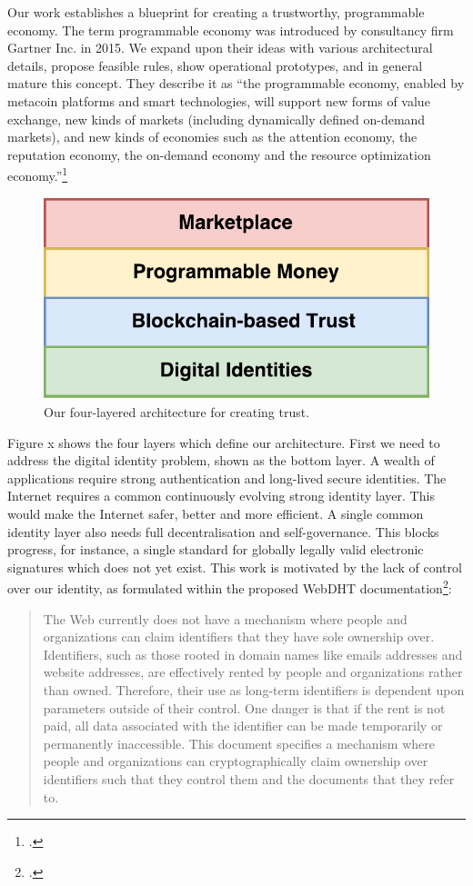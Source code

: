 \documentclass[USenglish]{article}
\begin{document}
Our work establishes a blueprint for creating a trustworthy, programmable economy.
The term programmable economy was introduced by consultancy firm Gartner Inc. in 2015. 
We expand upon their ideas with various architectural details, propose feasible rules, show operational prototypes, and in general mature this concept.
They describe it as ``the programmable economy, enabled by metacoin platforms and smart technologies, will support new forms of value exchange, new kinds of markets (including dynamically defined on-demand markets), and new kinds of economies such as the attention economy, the reputation economy, the on-demand economy and the resource optimization economy.''\footcite{gartnerprogrammableeconomy}

\begin{figure}[t]
	\centering
	\includegraphics[width=1\columnwidth]{assets/tech_stack_simple}
	\caption{Our four-layered architecture for creating trust.}
	\label{fig:tech_stack_simple}
\end{figure}

Figure x shows the four layers which define our architecture.
First we need to address the digital identity problem, shown as the bottom layer.
A wealth of applications require strong authentication and long-lived secure identities.
The Internet requires a common continuously evolving strong identity layer.
This would make the Internet safer, better and more efficient.
A single common identity layer also needs full decentralisation and self-governance.
This blocks progress, for instance, a single standard for globally legally valid electronic signatures which does not yet exist.
This work is motivated by the lack of control over our identity, as formulated within the proposed WebDHT documentation\footcite{webdhtproposal}: 

\blockquote{The Web currently does not have a mechanism where people and organizations can claim identifiers that they have sole ownership over. Identifiers, such as those rooted in domain names like emails addresses and website addresses, are effectively rented by people and organizations rather than owned. Therefore, their use as long-term identifiers is dependent upon parameters outside of their control. One danger is that if the rent is not paid, all data associated with the identifier can be made temporarily or permanently inaccessible. This document specifies a mechanism where people and organizations can cryptographically claim ownership over identifiers such that they control them and the documents that they refer to.}
\end{document}
